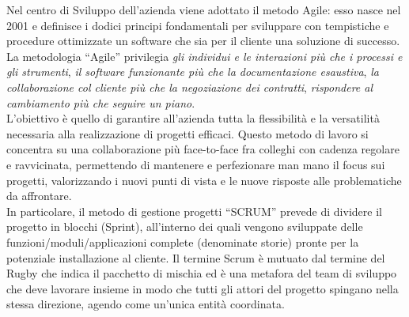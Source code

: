 Nel centro di Sviluppo dell'azienda viene adottato il metodo Agile: esso nasce nel 2001 e definisce i dodici principi fondamentali per sviluppare con tempistiche e procedure ottimizzate un software che sia per il cliente una soluzione di successo. La metodologia “Agile” privilegia \emph{gli individui e le interazioni più che i processi e gli strumenti}, \emph{il software funzionante più che la documentazione esaustiva}, \emph{la collaborazione col cliente più che la negoziazione dei contratti}, \emph{rispondere al cambiamento più che seguire un piano}. \\ L’obiettivo è quello di garantire all’azienda tutta la flessibilità e la versatilità necessaria alla realizzazione di progetti efficaci. Questo metodo di lavoro si concentra su una collaborazione più face-to-face fra colleghi con cadenza regolare e ravvicinata, permettendo di mantenere e perfezionare man mano il focus sui progetti, valorizzando i nuovi punti di vista e le nuove risposte alle problematiche da affrontare. \\ In particolare, il metodo di gestione progetti “SCRUM” prevede di dividere il progetto in blocchi (Sprint), all’interno dei quali vengono sviluppate delle funzioni/moduli/applicazioni complete (denominate storie) pronte per la potenziale installazione al cliente. Il termine Scrum è mutuato dal termine del Rugby che indica il pacchetto di mischia ed è una metafora del team di sviluppo che deve lavorare insieme in modo che tutti gli attori del progetto spingano nella stessa direzione, agendo come un’unica entità coordinata.


